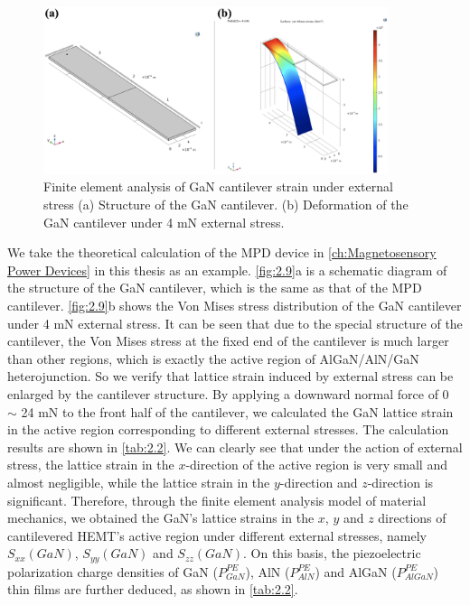 \begin{figure}[H] 
\centering    
\includegraphics[width=0.9\textwidth]{ch2_9}
\caption[Finite element analysis of GaN cantilever strain under external stress]{Finite element analysis of GaN cantilever strain under external stress (a) Structure of the GaN cantilever. (b) Deformation of the GaN cantilever under 4 \unit{\mN} external stress.}
\label{fig:2.9}
\end{figure}

We take the theoretical calculation of the MPD  device in \autoref{ch:Magnetosensory Power Devices} in this thesis as an example. \autoref{fig:2.9}a is a schematic diagram of the structure of the  GaN cantilever, which is the same as that of the MPD cantilever. \autoref{fig:2.9}b shows the Von Mises stress  distribution of the GaN cantilever under 4 \unit{\mN} external stress. It can be seen that due to the special structure of the cantilever, the Von Mises stress at the fixed end of the cantilever is much larger than other regions, which is exactly the active region  of  AlGaN/AlN/GaN heterojunction. So we verify that lattice strain  induced by external stress can be enlarged by the cantilever structure. By applying a downward normal force of 0 $\sim$ 24 \unit{\mN} to the front half of the cantilever, we calculated the GaN lattice strain  in the active region  corresponding to different external stresses. The calculation results are shown in \autoref{tab:2.2}. We can clearly see that under the action of external stress, the lattice strain in the $x$-direction of the active region is very small and almost negligible, while the lattice strain in the $y$-direction and $z$-direction is significant. Therefore, through the finite element analysis  model of material mechanics, we obtained the GaN's lattice strains in the $x$, $y$ and $z$ directions of  cantilevered HEMT's active region under different external stresses, namely $𝑆_{xx}(GaN)$, $𝑆_{yy}(GaN)$ and $𝑆_{zz}(GaN)$. On this basis, the piezoelectric polarization charge  densities of GaN ($P_{GaN}^{PE}$), AlN ($P_{AlN}^{PE}$) and AlGaN ($P_{AlGaN}^{PE}$) thin films  are further deduced, as shown in \autoref{tab:2.2}.

